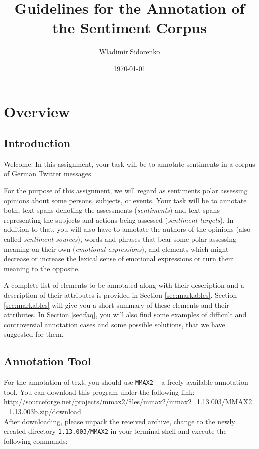 \documentclass[11pt,a4paper]{article}
\author{Wladimir Sidorenko}
\date{\today}
\title{Guidelines for the Annotation of the Sentiment Corpus}
\begin{document}
\maketitle{}
\section{Overview}
\subsection{Introduction}

Welcome.  In this assignment, your task will be to annotate sentiments in a
corpus of German Twitter messages.

For the purpose of this assignment, we will regard as sentiments polar
assessing opinions about some persons, subjects, or events.  Your task will be
to annotate both, text spans denoting the assessments (\textit{sentiments})
and text spans representing the subjects and actions being assessed
(\textit{sentiment targets}). In addition to that, you will also have to
annotate the authors of the opinions (also called \textit{sentiment sources}),
words and phrases that bear some polar assessing meaning on their own
(\textit{emotional expressions}), and elements which might decrease or
increase the lexical sense of emotional expressions or turn their meaning to
the opposite.

A complete list of elements to be annotated along with their description and
a description of their attributes is provided in Section \ref{sec:markables}.
Section \ref{sec:markables} will give you a short summary of these elements
and their attributes. In Section \ref{sec:faq}, you will also find some
examples of difficult and controversial annotation cases and some possible
solutions, that we have suggested for them.

\subsection{Annotation Tool}

For the annotation of text, you should use \texttt{MMAX2} -- a freely
available annotation tool.  You can download this program under the
following link:\\\newline
{\setlength{\parindent}{0pt}\small\url{http://sourceforge.net/projects/mmax2/files/mmax2/mmax2_1.13.003/MMAX2_1.13.003b.zip/download}}\\\newline
After downloading, please unpack the received archive, change to the
newly created directory \texttt{1.13.003/MMAX2} in your terminal shell
and execute the following commands:\\
\end{document}
